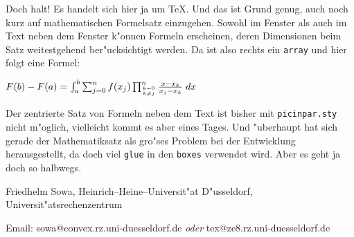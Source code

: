 \begin{window}[3,r,{\arraycolsep=2.5pt \def\arraystretch{.75}
$\left(\begin{array}{ccccccccc}%
	 *&*&*&*&&&&&\\
        **&*&*&*&*&&&&\\ \cline{3-6}
	 *&*&\multicolumn{1}{|c}{*}&*&*&\multicolumn{1}{c|}{*}&&&\\
	 &*&\multicolumn{1}{|c}{*}&*&*&\multicolumn{1}{c|}{*}&*&&\\
	 &&\multicolumn{1}{|c}{*}&*&*&\multicolumn{1}{c|}{*}&*&*&\\ \cline{3-6}
	 &&&*&*&*&*&*&*\\
	 &&&&*&*&*&*&*\\
	 &&&&&*&*&*&*\\
	 &&&&&&*&*&*
	 \end{array}
   \right)$},{}]
Doch halt! Es handelt sich hier ja um \TeX{}. Und das ist Grund genug, auch
noch kurz auf mathematischen Formelsatz einzugehen. Sowohl im Fenster als
auch im Text neben dem Fenster k"onnen Formeln erscheinen, deren Dimensionen
beim Satz weitestgehend ber"ucksichtigt werden. Da ist also rechts ein
{\tt array} und hier folgt eine Formel:

\def\formel#1#2#3#4#5{#1(#4)-#1(#3)=
\int_{#3}^{#4}\sum_{j=0}^{#5}#2(x_j)
\prod_{{k=0}\atop{k\not= j}}^{#5}
{x-x_k\over x_j-x_k}\; dx}
$\formel Ffabn$

Der zentrierte Satz von Formeln neben dem Text ist bisher mit
{\tt picinpar.sty} nicht m"oglich, vielleicht kommt es aber eines
Tages. Und "uberhaupt hat sich gerade der Mathematiksatz als gro"ses
Problem bei der Entwicklung herausgestellt, da doch viel {\tt glue} in
den {\tt boxes} verwendet wird. Aber es geht ja doch so halbwegs.
\end{window}
\vfill
\centerline{Friedhelm Sowa, Heinrich--Heine--Universit"at D"usseldorf,
Universit"atsrechenzentrum}
\centerline{Email: sowa@convex.rz.uni-duesseldorf.de {\sl oder}
tex@ze8.rz.uni-duesseldorf.de}


